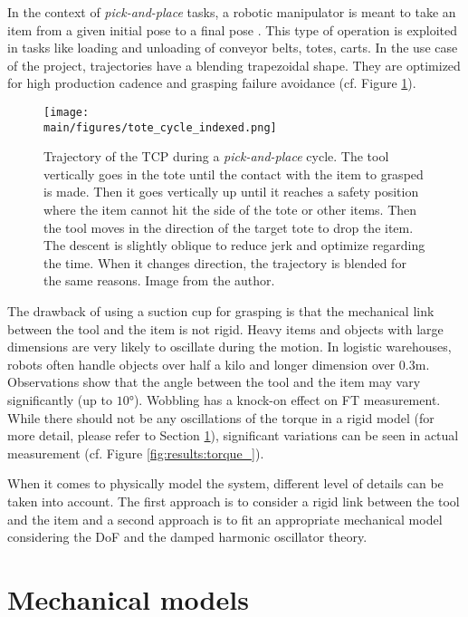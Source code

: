 \documentclass[/home/francois/latex/report/main.tex]{subfiles}
\begin{document}
In the context of \textit{pick-and-place} tasks, a robotic manipulator is meant to
take an item from a given initial pose to a final pose \cite{Angeles2006}. This type of operation is exploited in tasks like loading and unloading of conveyor belts, totes, carts. In the use case of the project, trajectories have a blending trapezoidal shape. They are optimized for high production cadence and grasping failure avoidance (cf. Figure \ref{fig:background:tote_cycle}).

\begin{figure}
  \centering
  \texttt{[image: \\main/figures/tote\_cycle\_indexed.png]}
  \caption{Trajectory of the \ac{TCP} during a \textit{pick-and-place} cycle. The tool vertically goes in the tote until the contact with the item to grasped is made. Then it goes vertically up until it reaches a safety position where the item cannot hit the side of the tote or other items. Then the tool moves in the direction of the target tote to drop the item. The descent is slightly oblique to reduce jerk and optimize regarding the time. When it changes direction, the trajectory is blended for the same reasons. Image from the author.}
  \label{fig:background:tote_cycle}
\end{figure}

The drawback of using a suction cup for grasping is that the mechanical link between the tool and the item is not rigid. Heavy items and objects with large dimensions are very likely to oscillate during the motion. In logistic warehouses, robots often handle objects over half a kilo and longer dimension over $0.3 \si{\meter}$. Observations show that the angle between the tool and the item may vary significantly (up to $10 \si{\degree}$). Wobbling has a knock-on effect on \ac{FT} measurement. While there should not be any oscillations of the torque in a rigid model (for more detail, please refer to Section \ref{section:mechanical-models}), significant variations can be seen in actual measurement (cf. Figure \ref{fig:results:torque_}).

When it comes to physically model the system, different level of details can be taken into account. The first approach is to consider a rigid link between the tool and the item and a second approach is to fit an appropriate mechanical model considering the \ac{DoF} and the damped harmonic oscillator theory.

\section{Mechanical models}
\label{section:mechanical-models}
\end{document}
